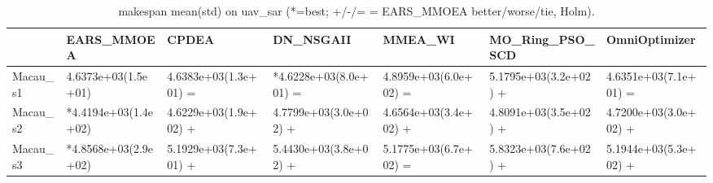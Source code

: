 \begin{table}[t]
\centering
\caption{makespan mean(std) on uav_sar (*=best; +/-/= = EARS_MMOEA better/worse/tie, Holm).}
\label{tab:uav_sar_makespan}
\begin{tabular}{lllllll}
\toprule
 & EARS\_MMOEA & CPDEA & DN\_NSGAII & MMEA\_WI & MO\_Ring\_PSO\_SCD & OmniOptimizer \\
\midrule
Macau\_s1 & 4.6373e+03(1.5e+01) & 4.6383e+03(1.3e+01) = & *4.6228e+03(8.0e+01) = & 4.8959e+03(6.0e+02) = & 5.1795e+03(3.2e+02) + & 4.6351e+03(7.1e+01) = \\
Macau\_s2 & *4.4194e+03(1.4e+02) & 4.6229e+03(1.9e+02) + & 4.7799e+03(3.0e+02) + & 4.6564e+03(3.4e+02) + & 4.8091e+03(3.5e+02) + & 4.7200e+03(3.0e+02) + \\
Macau\_s3 & *4.8568e+03(2.9e+02) & 5.1929e+03(7.3e+01) + & 5.4430e+03(3.8e+02) + & 5.1775e+03(6.7e+02) = & 5.8323e+03(7.6e+02) + & 5.1944e+03(5.3e+02) + \\
\bottomrule
\end{tabular}
\end{table}
